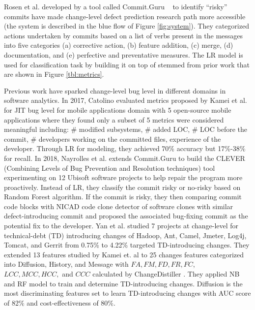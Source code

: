 \documentclass[sigconf,review, anonymous]{acmart}
\begin{document}
Rosen et al. developed by a tool called Commit.Guru ~\cite{commitguru} to identify ``risky'' commits have made change-level defect prediction research path more accessible (the system is described in the blue flow of Figure \ref{fig:system}). They categorized actions undertaken by commits based on a list of verbs present in the messages into five categories (a) corrective action, (b) feature addition, (c) merge, (d) documentation, and (e) perfective and preventative measures. The LR model is used for classification task by building it on top of  stemmed from prior work  that are shown in Figure \ref{tbl:metrics}. 
 
Previous work have sparked change-level bug level in different domains in software analytics. In 2017, Catolino \cite{catolino17_jitmobile} evaluated metrics proposed by Kamei et al. \cite{kamei12_jit} for JIT bug level for mobile applications domain with 5 open-source mobile applications where they found only a subset of 5 metrics were considered meaningful including: \# modified subsystems, \# added LOC, \# LOC before the commit, \# developers working on the committed files, experience of the developer. Through LR for modeling, they achieved 70\% accuracy but 17\%-38\% for recall. In 2018, Nayrolles et al. \cite{nayrolles18_clever} extends Commit.Guru to build the CLEVER (Combining Levels of Bug Prevention and Resolution techniques) tool experimenting on 12 Ubisoft software projects to help repair the program more proactively. Instead of LR, they classify the commit risky or no-risky based on Random Forest algorithm. If the commit is risky, they then comparing commit code blocks with NICAD code clone detector \cite{cordy11_NiCad} of software clones with similar defect-introducing commit and proposed the associated bug-fixing commit as the potential fix to the developer. Yan et al. \cite{yan18_tddetermination} studied 7 projects at change-level for technical-debt (TD) introducing changes of Hadoop, Ant, Camel, Jmeter, Log4j, Tomcat, and Gerrit from 0.75\% to 4.22\% targeted TD-introducing changes. They extended 13 features studied by Kamei et. al \cite{kamei12_jit} to 25 changes features categorized into Diffusion, History, and Message with $FA, FM, FD, FR, FC$, $LCC, MCC, HCC,$ and $CCC$ calculated by ChangeDistiller \cite{fluri07_changedistiller}. They applied NB and RF model to train and determine TD-introducing changes. Diffusion is the most discriminating features set to learn TD-introducing changes with AUC score of 82\% and cost-effectiveness of 80\%.
\end{document}
